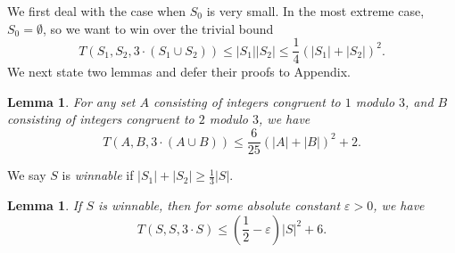 \documentclass[12pt, notitlepage]{amsart}
\numberwithin{equation}{section}
\newtheorem{lemma}[theorem]{Lemma}
\theoremstyle{remark}
\theoremstyle{definition}
\theoremstyle{remark}
\numberwithin{equation}{section}
\begin{document}
We first deal with the case when $S_0$ is very small. In the most extreme case, $S_0 = \emptyset$, so we want to win over the trivial bound
$$T(S_1, S_2, 3 \cdot (S_1 \cup S_2)) \leq |S_1||S_2| \leq \frac{1}{4} \left(|S_1| + |S_2|\right)^2.$$
We next state two lemmas and defer their proofs to Appendix. 
\begin{lemma}
\label{lemma ABAcupB}
For any set $A$ consisting of integers congruent to $1$ modulo $3$, and $B$ consisting of integers congruent to $2$ modulo $3$, we have 
$$T(A, B, 3 \cdot (A \cup B)) \leq \frac{6}{25} \left(|A| + |B|\right)^2 + 2.$$
\end{lemma}

We say $S$ is \textit{winnable} if $|S_1| + |S_2| \geq \frac{1}{3}|S|$.
\begin{lemma}\label{lem 3.4}
    If $S$ is winnable, then for some absolute constant $\varepsilon > 0$, we have
    $$T(S, S, 3 \cdot S) \leq \left(\frac{1}{2} - \varepsilon\right) |S|^2 + 6.$$
\end{lemma}
\end{document}
